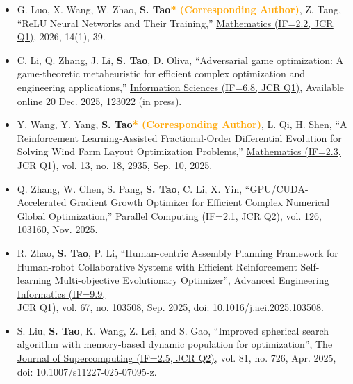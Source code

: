 \documentclass[11pt,a4paper,sans]{moderncv}
\renewcommand{\underline}[1]{\uline{#1}}
\begin{document}
{\begin{itemize}[label=\textbullet]
      \item [31)] G. Luo, X. Wang, W. Zhao, \textbf{S. Tao\textcolor{orange}{* (Corresponding Author)}}, Z. Tang, “ReLU Neural Networks and Their Training,” \color{black}\href{https://doi.org/10.3390/math14010039}{\underline{Mathematics (IF=2.2, JCR Q1)}}, 2026, 14(1), 39.

      \item [30)] C. Li, Q. Zhang, J. Li, \textbf{S. Tao}, D. Oliva, “Adversarial game optimization: A game-theoretic metaheuristic for efficient complex optimization and engineering applications,” \color{black}\href{https://doi.org/10.1016/j.ins.2025.123022}{\underline{Information Sciences (IF=6.8, JCR Q1)}}, Available online 20 Dec. 2025, 123022 (in press).
      
      \item [29)] Y. Wang, Y. Yang, \textbf{S. Tao\textcolor{orange}{* (Corresponding Author)}}, L. Qi, H. Shen, “A Reinforcement Learning-Assisted Fractional-Order Differential Evolution for Solving Wind Farm Layout Optimization Problems,” \color{black}\href{https://doi.org/10.3390/math13182935}{\underline{Mathematics (IF=2.3, JCR Q1)}}, vol. 13, no. 18, 2935, Sep. 10, 2025.

      \item [28)] Q. Zhang, W. Chen, S. Pang, \textbf{S. Tao}, C. Li, X. Yin, “GPU/CUDA-Accelerated Gradient Growth Optimizer for Efficient Complex Numerical Global Optimization,” \color{black}\href{https://doi.org/10.1016/j.parco.2025.103160}{\underline{Parallel Computing (IF=2.1, JCR Q2)}}, vol. 126, 103160, Nov. 2025.

      \item [27)] R. Zhao, \textbf{S. Tao}, P. Li, “Human-centric Assembly Planning Framework for Human-robot Collaborative Systems with Efficient Reinforcement Self-learning Multi-objective Evolutionary Optimizer”, \color{black}\href{https://www.sciencedirect.com/journal/advanced-engineering-informatics}{\underline{Advanced Engineering Informatics (IF=9.9, }\\\underline{JCR Q1)}}, vol. 67, no. 103508, Sep. 2025, doi: 10.1016/j.aei.2025.103508.
      
      \item [26)] S. Liu, \textbf{S. Tao}, K. Wang, Z. Lei, and S. Gao, “Improved spherical search algorithm with memory-based dynamic population for optimization”, \color{black}\href{https://link.springer.com/journal/11227}{\underline{The Journal of Supercomputing (IF=2.5, JCR Q2)}}, vol. 81, no. 726, Apr. 2025, doi: 10.1007/s11227-025-07095-z.
      

\end{itemize}}
\end{document}

